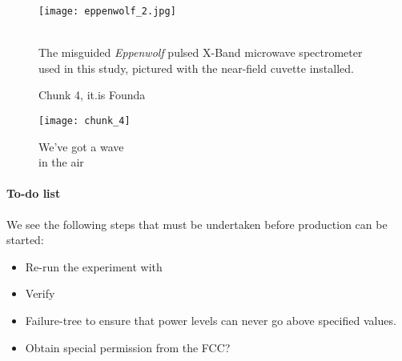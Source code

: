 \documentclass[fleqn,10pt]{article}
\begin{document}

	





\clearpage

\begin{figure}[H]
	\captionsetup{singlelinecheck = false, justification=justified}
	\centering
	\texttt{[image: eppenwolf\_2.jpg]}
	\caption{\\ The misguided {\it Eppenwolf} pulsed X-Band microwave spectrometer used in this study, pictured with the near-field cuvette installed.}
\end{figure}



\begin{figure}[H]
	\caption{Chunk 4, it.is Founda}
\end{figure}


\clearpage

\begin{figure}[H]
	\captionsetup{singlelinecheck = false, justification=justified}
	\centering
	\texttt{[image: chunk\_4]}
	\caption{
		We've got a wave\\
		in the air}
\end{figure}






\paragraph{To-do list}

We see the following steps that must be undertaken before production can be started:

\begin{itemize}
  \item Re-run the experiment with 
  \item Verify 
  \item Failure-tree to ensure that power levels can never go above specified values.
  \item Obtain special permission from the FCC?
\end{itemize}
\end{document}
